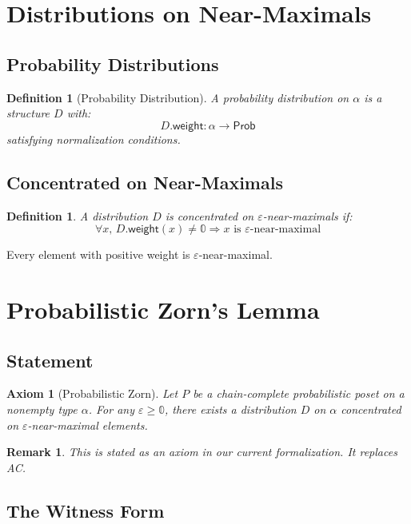 \documentclass[11pt,a4paper]{article}
\newtheorem{definition}[theorem]{Definition}
\newtheorem{axiom}{Axiom}
\newtheorem{remark}[theorem]{Remark}
\newcommand{\Prob}{\mathsf{Prob}}
\newcommand{\pzero}{\mathbb{0}}
\begin{document}
\section{Distributions on Near-Maximals}

\subsection{Probability Distributions}

\begin{definition}[Probability Distribution]
A \emph{probability distribution} on $\alpha$ is a structure $D$ with:
\[
D.\mathsf{weight} : \alpha \to \Prob
\]
satisfying normalization conditions.
\end{definition}

\subsection{Concentrated on Near-Maximals}

\begin{definition}
A distribution $D$ is \emph{concentrated on $\varepsilon$-near-maximals} if:
\[
\forall x,\, D.\mathsf{weight}(x) \neq \pzero \Rightarrow \text{$x$ is $\varepsilon$-near-maximal}
\]
\end{definition}

Every element with positive weight is $\varepsilon$-near-maximal.

\section{Probabilistic Zorn's Lemma}

\subsection{Statement}

\begin{axiom}[Probabilistic Zorn]
Let $P$ be a chain-complete probabilistic poset on a nonempty type $\alpha$. For any $\varepsilon \geq \pzero$, there exists a distribution $D$ on $\alpha$ concentrated on $\varepsilon$-near-maximal elements.
\end{axiom}

\begin{remark}
This is stated as an axiom in our current formalization. It replaces AC.
\end{remark}

\subsection{The Witness Form}
\end{document}
